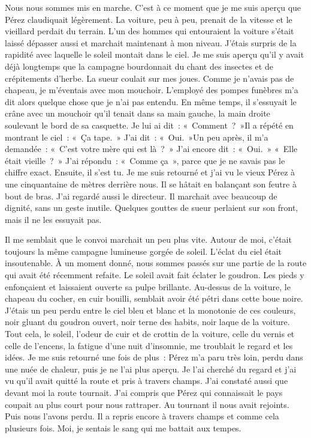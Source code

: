 \documentclass[french,twoside]{book} %
\begin{document}
Nous nous sommes mis en marche. C'est à ce moment que je me suis aperçu que Pérez claudiquait légèrement. La voiture, peu à peu, prenait de la vitesse et le vieillard perdait du terrain. L'un des hommes qui entouraient la voiture s’était laissé dépasser aussi et marchait maintenant à mon niveau. J'étais surpris de la rapidité avec laquelle le soleil montait dans le ciel. Je me suis aperçu qu’il y avait déjà longtemps que la campagne bourdonnait du chant des insectes et de crépitements d’herbe. La sueur coulait sur mes joues. Comme je n’avais pas de chapeau, je m’éventais avec mon mouchoir. L'employé des pompes funèbres m’a dit alors quelque chose que je n’ai pas entendu. En même temps, il s’essuyait le crâne avec un mouchoir qu’il tenait dans sa main gauche, la main droite soulevant le bord de sa casquette. Je lui ai dit : « Comment ? »Il a répété en montrant le ciel : « Ça tape. » J'ai dit : « Oui. »Un peu après, il m’a demandée : « C'est votre mère qui est là ? » J'ai encore dit : « Oui. » « Elle était vieille ? » J'ai répondu : « Comme ça », parce que je ne savais pas le chiffre exact. Ensuite, il s’est tu. Je me suis retourné et j’ai vu le vieux Pérez à une cinquantaine de mètres derrière nous. Il se hâtait en balançant son feutre à bout de bras. J'ai regardé aussi le directeur. Il marchait avec beaucoup de dignité, sans un geste inutile. Quelques gouttes de sueur perlaient sur son front, mais il ne les essuyait pas.\par
Il me semblait que le convoi marchait un peu plus vite. Autour de moi, c’était toujours la même campagne lumineuse gorgée de soleil. L'éclat du ciel était insoutenable. À un moment donné, nous sommes passés sur une partie de la route qui avait été récemment refaite. Le soleil avait fait éclater le goudron. Les pieds y enfonçaient et laissaient ouverte sa pulpe brillante. Au-dessus de la voiture, le chapeau du cocher, en cuir bouilli, semblait avoir été pétri dans cette boue noire. J'étais un peu perdu entre le ciel bleu et blanc et la monotonie de ces couleurs, noir gluant du goudron ouvert, noir terne des habits, noir laque de la voiture. Tout cela, le soleil, l’odeur de cuir et de crottin de la voiture, celle du vernis et celle de l’encens, la fatigue d’une nuit d’insomnie, me troublait le regard et les idées. Je me suis retourné une fois de plus : Pérez m’a paru très loin, perdu dans une nuée de chaleur, puis je ne l’ai plus aperçu. Je l’ai cherché du regard et j’ai vu qu’il avait quitté la route et pris à travers champs. J'ai constaté aussi que devant moi la route tournait. J'ai compris que Pérez qui connaissait le pays coupait au plus court pour nous rattraper. Au tournant il nous avait rejoints. Puis nous l’avons perdu. Il a repris encore à travers champs et comme cela plusieurs fois. Moi, je sentais le sang qui me battait aux tempes.\par
\end{document}
